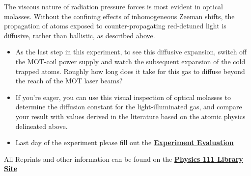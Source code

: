 \documentclass{../lab}
\begin{document}
The viscous nature of radiation pressure forces is most evident in optical molasses. Without the confining effects of inhomogeneous Zeeman shifts, the propagation of atoms exposed to counter-propagating red-detuned light is diffusive, rather than ballistic, as described \hyperref[subsubsec:MeasuringMOTTemperature]{above}.

\begin{itemize}
    \item As the last step in this experiment, to see this diffusive expansion, switch off the MOT-coil power supply and watch the subsequent expansion of the cold trapped atoms. Roughly how long does it take for this gas to diffuse beyond the reach of the MOT laser beams?

    \item If you're eager, you can use this visual inspection of optical molasses to determine the diffusion constant for the light-illuminated gas, and compare your result with values derived in the literature based on the atomic physics delineated above.

    \item Last day of the experiment please fill out the \href{\ExperimentEvaluation}{\textbf{Experiment Evaluation}}
\end{itemize}

All Reprints and other information can be found on the \href{http://physics111.lib.berkeley.edu/Physics111/Reprints/MOT/MOT\_index.html}{\textbf{Physics 111 Library Site}}
\end{document}
